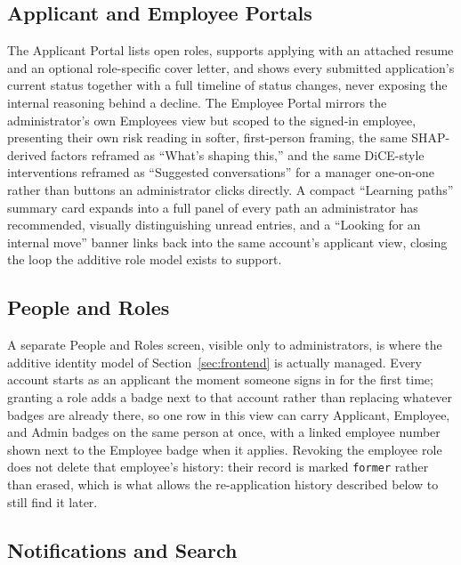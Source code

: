 \documentclass[11pt,a4paper]{article}
\newcommand{\code}[1]{\texttt{\footnotesize #1}}
\begin{document}
\subsection{Applicant and Employee Portals}

The Applicant Portal lists open roles, supports applying with an attached resume and an optional role-specific cover letter, and shows every submitted application's current status together with a full timeline of status changes, never exposing the internal reasoning behind a decline. The Employee Portal mirrors the administrator's own Employees view but scoped to the signed-in employee, presenting their own risk reading in softer, first-person framing, the same SHAP-derived factors reframed as ``What's shaping this,'' and the same DiCE-style interventions reframed as ``Suggested conversations'' for a manager one-on-one rather than buttons an administrator clicks directly. A compact ``Learning paths'' summary card expands into a full panel of every path an administrator has recommended, visually distinguishing unread entries, and a ``Looking for an internal move'' banner links back into the same account's applicant view, closing the loop the additive role model exists to support.

\subsection{People and Roles}

A separate People and Roles screen, visible only to administrators, is where the additive identity model of Section~\ref{sec:frontend} is actually managed. Every account starts as an applicant the moment someone signs in for the first time; granting a role adds a badge next to that account rather than replacing whatever badges are already there, so one row in this view can carry Applicant, Employee, and Admin badges on the same person at once, with a linked employee number shown next to the Employee badge when it applies. Revoking the employee role does not delete that employee's history: their record is marked \code{former} rather than erased, which is what allows the re-application history described below to still find it later.

\subsection{Notifications and Search}
\end{document}
